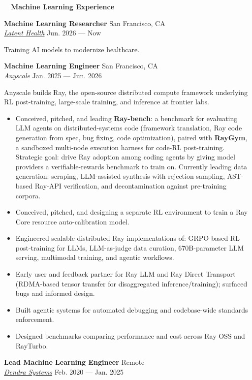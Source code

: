 \documentclass[a4paper,12pt]{article}
\newcommand{\resheading}[1]{{\hspace{-9pt} \colorbox{mygrey}{\begin{minipage}{\textwidth}{\textmd{~~\large \textbf{#1} \vphantom{p\^{E}}}}\end{minipage}}\vspace{6pt}} }
\newcommand{\ressubheading}[4]{{\begin{minipage}{\textwidth}
                                    \textbf{#1} \hfill #2 \\
                                    \textit{#3} \hfill #4 \\
\end{minipage}}}
\begin{document}
    \resheading{Machine Learning Experience}
  
    \ressubheading{Machine Learning Researcher}{San Francisco, CA}{\href{https://www.latenthealth.com/}{Latent Health}}{Jun. 2026 --- Now}

    \vspace{-6pt} Training AI models to modernize healthcare.\\

    \ressubheading{Machine Learning Engineer}{San Francisco, CA}{\href{https://www.anyscale.com/}{Anyscale}}{Jan. 2025 --- Jun. 2026}

    \vspace{-6pt} Anyscale builds Ray, the open-source distributed compute framework underlying RL post-training, large-scale training, and inference at frontier labs.
    \begin{itemize}
    \item Conceived, pitched, and leading \textbf{Ray-bench}: a benchmark for evaluating LLM agents on distributed-systems code (framework translation, Ray code generation from spec, bug fixing, code optimization), paired with \textbf{RayGym}, a sandboxed multi-node execution harness for code-RL post-training. Strategic goal: drive Ray adoption among coding agents by giving model providers a verifiable-rewards benchmark to train on. Currently leading data generation: scraping, LLM-assisted synthesis with rejection sampling, AST-based Ray-API verification, and decontamination against pre-training corpora.
    \item Conceived, pitched, and designing a separate RL environment to train a Ray Core resource auto-calibration model.
    \item Engineered scalable distributed Ray implementations of: GRPO-based RL post-training for LLMs, LLM-as-judge data curation, 670B-parameter LLM serving, multimodal training, and agentic workflows.
    \item Early user and feedback partner for Ray LLM and Ray Direct Transport (RDMA-based tensor transfer for disaggregated inference/training); surfaced bugs and informed design.
    \item Built agentic systems for automated debugging and codebase-wide standards enforcement.
    \item Designed benchmarks comparing performance and cost across Ray OSS and RayTurbo.
    \end{itemize}
    
    \ressubheading{Lead Machine Learning Engineer}{Remote}{\href{dendra.io}{Dendra Systems}}{Feb. 2020 --- Jan. 2025}
\end{document}
